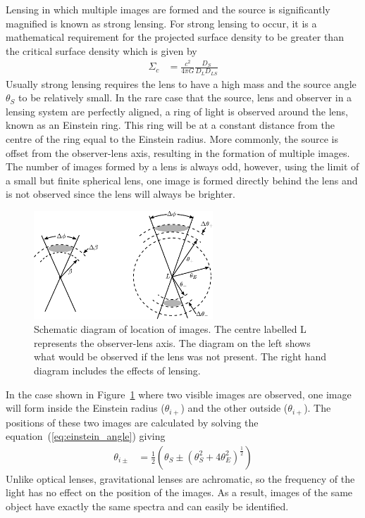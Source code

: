 		Lensing in which multiple images are formed and the source is significantly magnified is known as strong lensing. For strong lensing to occur, it is a mathematical requirement for the projected surface density to be greater than the critical surface density which is given by\cite{Critical_surface_density}
		\begin{align}
			\Sigma_c &= \frac{c^2}{4\pi G}\frac{D_S}{D_L D_{LS}}
		\end{align}
		Usually strong lensing requires the lens to have a high mass and the source angle $\theta_S$ to be relatively small. In the rare case that the source, lens and observer in a lensing system are perfectly aligned, a ring of light is observed around the lens, known as an Einstein ring. This ring will be at a constant distance from the centre of the ring equal to the Einstein radius. More commonly, the source is offset from the observer-lens axis, resulting in the formation of multiple images. The number of images formed by a lens is always odd, however, using the limit of a small but finite spherical lens, one image is formed directly behind the lens and is not observed since the lens will always be brighter.
		\begin{figure}[htbp]
			\centering
				\includegraphics[width=0.6\textwidth]{../Images/Lensing_image_positions2.pdf}
				\caption[Schematic diagram of location of images]{Schematic diagram of location of images. The centre labelled L represents the observer-lens axis. The diagram on the left shows what would be observed if the lens was not present. The right hand diagram includes the effects of lensing\cite{Hartle}.\label{fig:Lensing_image_positions2}}
		\end{figure}

		In the case shown in Figure~\ref{fig:Lensing_image_positions2} where two visible images are observed, one image will form inside the Einstein radius ($\theta_{i+}$) and the other outside ($\theta_{i+}$). The positions of these two images are calculated by solving the equation~(\ref{eq:einstein_angle}) giving
		\begin{align}
			\theta_{i\pm} &= \frac{1}{2}\left( \theta_S \pm {(\theta_S^2 + 4\theta_E^2)} ^{\frac{1}{2}} \right) \label{eq:image_position}
		\end{align}
		Unlike optical lenses, gravitational lenses are achromatic, so the frequency of the light has no effect on the position of the images. As a result, images of the same object have exactly the same spectra and can easily be identified\cite{Hartle}.

